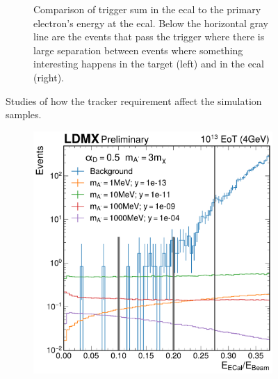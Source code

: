 \begin{figure}
\begin{subfigure}{0.48\textwidth}
    \caption{Comparison of trigger sum in the \ac{ecal} to the primary electron's
    energy at the \ac{ecal}. Below the horizontal gray line are the events that
    pass the trigger where there is large separation between events where something
    interesting happens in the target (left) and in the \ac{ecal} (right).}
  \end{subfigure}
  \caption{Studies of how the tracker requirement affect the simulation samples.}
  \label{fig:tracker-req}
\end{figure}

\begin{figure}
    \centering
    \begin{subfigure}{0.48\textwidth}
       \includegraphics[width=\textwidth]{figures/ldmx/analysis/final-selection-with-ana-bin-edges-4gev.pdf}
    \end{subfigure}
    ~
    \begin{subfigure}{0.48\textwidth}

\end{subfigure}
\end{figure}
